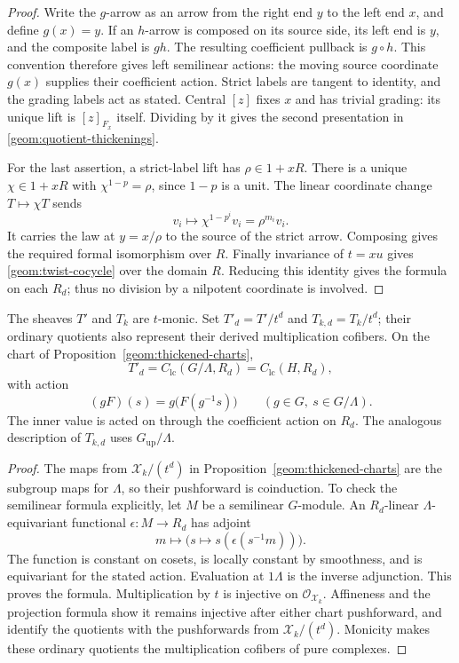\begin{proof}
Write the $g$-arrow as an arrow from the right end $y$ to the left
end $x$, and define $g(x)=y$.  If an $h$-arrow is composed on its
source side, its left end is $y$, and the composite label is $gh$.
The resulting coefficient pullback is $g\circ h$.  This convention
therefore gives left semilinear actions: the moving source coordinate
$g(x)$ supplies their coefficient action.  Strict labels are tangent
to identity, and the grading labels act as stated.  Central $[z]$
fixes $x$ and has trivial grading: its unique lift is $[z]_{F_x}$
itself.  Dividing by it gives the second presentation in
\eqref{geom:quotient-thickenings}.

For the last assertion, a strict-label lift has $\rho\in1+xR$.
There is a unique $\chi\in1+xR$ with $\chi^{1-p}=\rho$, since
$1-p$ is a unit.  The linear coordinate change $T\mapsto\chi T$
sends
\[
 v_i\longmapsto\chi^{1-p^i}v_i=\rho^{m_i}v_i.
\]
It carries the law at $y=x/\rho$ to the source of the strict
arrow.  Composing gives the required formal isomorphism over $R$.
Finally invariance of $t=xu$ gives \eqref{geom:twist-cocycle} over
the domain $R$.  Reducing this identity gives the formula on each
$R_d$; thus no division by a nilpotent coordinate is involved.
\end{proof}

\begin{proposition}\label{geom:coinduction}
The sheaves $T'$ and $T_k$ are $t$-monic.  Set
$T'_d=T'/t^d$ and $T_{k,d}=T_k/t^d$; their ordinary quotients also
represent their derived multiplication cofibers.  On the chart of
Proposition~\ref{geom:thickened-charts},
\[
 T'_d=C_{\mathrm{lc}}(G/\Lambda,R_d)
       =C_{\mathrm{lc}}(H,R_d),
\]
with action
\[
 (gF)(s)=g\bigl(F(g^{-1}s)\bigr)
       \qquad(g\in G,\ s\in G/\Lambda).
\]
The inner value is acted on through the coefficient action on $R_d$.
The analogous description of $T_{k,d}$ uses
$G_{\mathrm{up}}/\Lambda$.
\end{proposition}

\begin{proof}
The maps from $\mathcal X_k/(t^d)$ in
Proposition~\ref{geom:thickened-charts} are the subgroup maps for
$\Lambda$, so their pushforward is coinduction.  To check the
semilinear formula explicitly, let $M$ be a semilinear $G$-module.  An $R_d$-linear
$\Lambda$-equivariant functional $\epsilon:M\to R_d$ has adjoint
\[
 m\longmapsto\bigl(s\longmapsto s(\epsilon(s^{-1}m))\bigr).
\]
The function is constant on cosets, is locally constant by
smoothness, and is equivariant for the stated action.  Evaluation
at $1\Lambda$ is the inverse adjunction.  This proves the formula.
Multiplication by $t$ is injective on $\mathcal O_{\mathcal X_k}$.
Affineness and the projection formula show it remains injective
after either chart pushforward, and identify the quotients with the
pushforwards from $\mathcal X_k/(t^d)$.  Monicity makes these
ordinary quotients the multiplication cofibers of pure complexes.
\end{proof}


